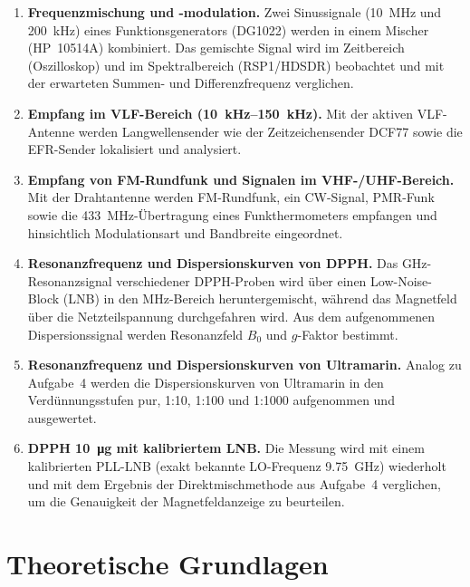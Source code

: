 \documentclass[11pt,a4paper]{article}
\begin{document}
\begin{enumerate}
    \item \textbf{Frequenzmischung und -modulation.} Zwei Sinussignale
    (\SI{10}{\mega\hertz} und \SI{200}{\kilo\hertz}) eines
    Funktionsgenerators (DG1022) werden in einem Mischer (HP~10514A)
    kombiniert. Das gemischte Signal wird im Zeitbereich (Oszilloskop) und im
    Spektralbereich (RSP1/HDSDR) beobachtet und mit der erwarteten Summen-
    und Differenzfrequenz verglichen.

    \item \textbf{Empfang im VLF-Bereich (\SIrange{10}{150}{\kilo\hertz}).}
    Mit der aktiven VLF-Antenne werden Langwellensender wie der Zeitzeichensender
    DCF77 sowie die EFR-Sender lokalisiert und analysiert.

    \item \textbf{Empfang von FM-Rundfunk und Signalen im VHF-/UHF-Bereich.}
    Mit der Drahtantenne werden FM-Rundfunk, ein CW-Signal, PMR-Funk sowie die
    \SI{433}{\mega\hertz}-Übertragung eines Funkthermometers empfangen und
    hinsichtlich Modulationsart und Bandbreite eingeordnet.

    \item \textbf{Resonanzfrequenz und Dispersionskurven von DPPH.} Das
    GHz-Resonanzsignal verschiedener DPPH-Proben wird über einen
    Low-Noise-Block (LNB) in den MHz-Bereich heruntergemischt, während das
    Magnetfeld über die Netzteilspannung durchgefahren wird. Aus dem
    aufgenommenen Dispersionssignal werden Resonanzfeld $B_0$ und $g$-Faktor
    bestimmt.

    \item \textbf{Resonanzfrequenz und Dispersionskurven von Ultramarin.}
    Analog zu Aufgabe~4 werden die Dispersionskurven von Ultramarin in den
    Verdünnungsstufen pur, 1:10, 1:100 und 1:1000 aufgenommen und ausgewertet.

    \item \textbf{DPPH \SI{10}{\micro\gram} mit kalibriertem LNB.} Die
    Messung wird mit einem kalibrierten PLL-LNB (exakt bekannte LO-Frequenz
    \SI{9.75}{\giga\hertz}) wiederholt und mit dem Ergebnis der
    Direktmischmethode aus Aufgabe~4 verglichen, um die Genauigkeit der
    Magnetfeldanzeige zu beurteilen.
\end{enumerate}

\section{Theoretische Grundlagen}
\end{document}
